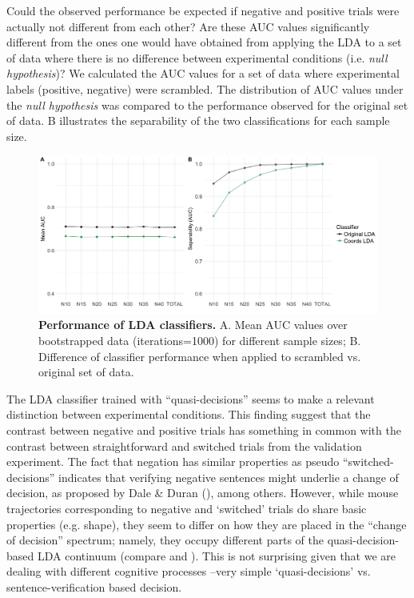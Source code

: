 \documentclass{article}
\begin{document}
Could the observed performance be expected if negative and positive trials were actually not different from each other? Are these AUC values significantly different from the ones one would have obtained from applying the LDA to a set of data where there is no difference between experimental conditions (i.e. \emph{null hypothesis})? We calculated the AUC values for a set of data where experimental labels (positive, negative) were scrambled. The distribution of AUC values under the \emph{null hypothesis} was compared to the performance observed for the original set of data. B illustrates the separability of the two classifications for each sample size.

\begin{figure}
\centering
\includegraphics[width=\textwidth]{auc_permutation_negation_1.png}
\caption{\textbf{Performance of LDA classifiers.} A. Mean AUC values over bootstrapped data (iterations=1000) for different sample sizes;  B. Difference of classifier performance when applied to scrambled vs. original set of data.}
\label{fig:permutation_AUC_negation}
\end{figure}


The LDA classifier trained with ``quasi-decisions'' seems to make a relevant distinction between experimental conditions. This finding suggest that the contrast between negative and positive trials has something in common with the contrast between straightforward and switched trials from the validation experiment. The fact that negation has similar properties as pseudo “switched-decisions'' indicates that verifying negative sentences might underlie a change of decision, as proposed by Dale \& Duran (\citeyear{Dale2011}), among others.  
However, while mouse trajectories corresponding to negative and `switched' trials do share basic properties (e.g. shape), they seem to differ on how they are placed in the “change of decision” spectrum; namely, they occupy different parts of the quasi-decision-based LDA continuum (compare  and ). This is not surprising given that we are dealing with different cognitive processes --very simple `quasi-decisions' vs. sentence-verification based decision. 
\end{document}
